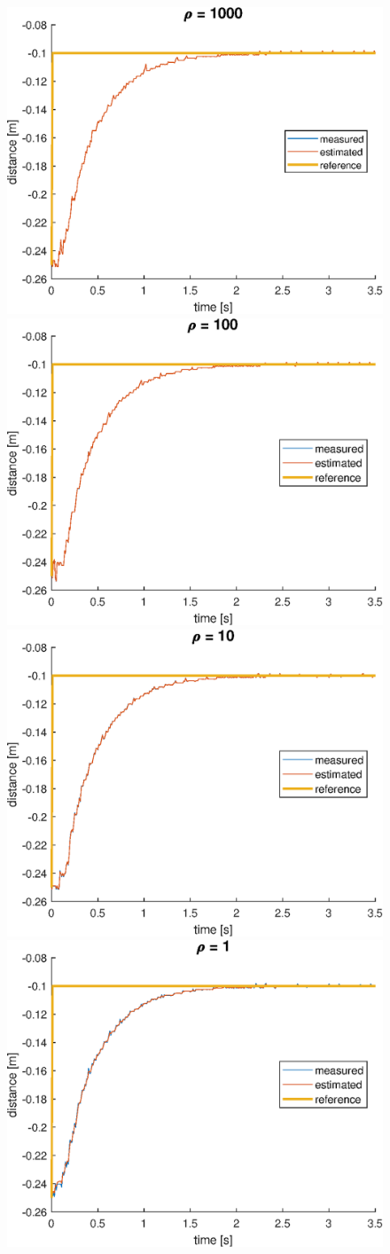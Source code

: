 \documentclass[a4paper,kul]{kulakarticle} %
\begin{document}
\begin{figure}[htp!]
	\centering
	\includegraphics[width =0.45\linewidth]{wrong_pos_1000.eps} \quad
	\includegraphics[width =0.45\linewidth]{wrong_pos_100}
	\includegraphics[width =0.45\linewidth]{wrong_pos_10.eps}\quad
	\includegraphics[width =0.45\linewidth]{wrong_pos_1}

\end{figure}
\end{document}
